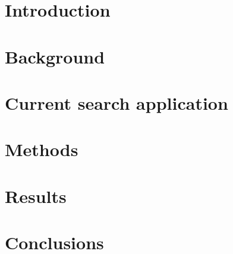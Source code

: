 

\chapter{Introduction}
\label{ch:introduction}




\chapter{Background}
\label{ch:background}




\chapter{Current search application}
\label{ch:currentsearch}




\chapter{Methods}
\label{ch:methods}




\chapter{Results}
\label{ch:results}




\chapter{Conclusions}




